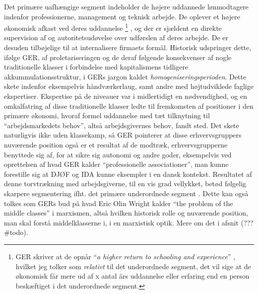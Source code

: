 Det primære uafhængige segment \label{GER kontrol og intern arb marked} indeholder de højere uddannede lønmodtagere indenfor professionerne, management og teknisk arbejde. De oplever et højere økonomisk afkast ved deres uddannelse%
% 
\footnote{GER skriver at de opnår “\emph{a higher return to schooling and experience}” \parencite[202]{Gordon1982}, hvilket jeg tolker som \emph{relativt} til det underordnede segment, det vil sige at de økonomisk får mere ud af x antal års uddannelse eller erfaring end en person beskæftiget i det underordnede segment.}%
%
, og der er sjældent en direkte supervision af og autoritetsudøvelse over udførslen af deres arbejde. De er desuden tilbøjelige til at internalisere firmaets formål. 
Historisk udspringer dette, ifølge GER, af proletariseringen og de deraf følgende konsekvenser af nogle traditionelle klasser i forbindelse med kapitalismens tidligere akkummulationsstruktur, i GERs jargon kaldet \emph{homogeniseringsperioden}.  Dette skete indenfor eksempelvis håndværkerlaug, samt andre med højtudviklede faglige ekspertiser. Ekspertise på de niveauer var i midlertidigt en nødvendighed, og en omkalfatring af disse traditionelle klasser ledte til fremkomsten af positioner i den primære økonomi, hvoraf formel uddannelse med tæt tilknytning til “arbejdsmarkedets behov”, altså arbejdsgivernes behov, fandt sted. Det skete naturligvis ikke uden klassekamp, så GER pointerer at disse erhvervsgruppers nuværende position også er et resultat af de modtræk, erhvervsgrupperne benyttede sig af, for at sikre sig autonomi og andre goder, eksempelvis ved oprettelsen af hvad GER kalder “professionelle associationer”, man kunne forestille sig at DJØF og IDA kunne eksempler i en dansk kontekst. Resultatet af denne torvtrækning med arbejdsgiverne, til en vis grad vellykket, betød følgelig skarpere segmentering ifht. det primære underordnede segment \parencite[202f]{Gordon1982}.
Dette kan også tolkes som GERs bud på hvad Eric Olin Wright kalder “the problem of the middle classes” i marxismen, altså hvilken historisk rolle og nuværende position, man skal forstå middelklasserne i, i en marxistisk optik. Mere om det i afsnit (??? \#todo).

